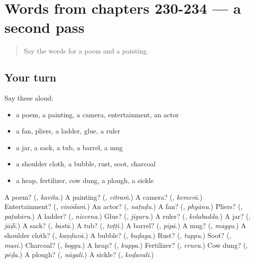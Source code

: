 \section[(dialogue)]{Words from chapters 230-234 — a second pass}

\label{lesson:TE-R234-second-pass-words-from-chapters-230-234}



\begin{quote}
Say the words for a poem and a painting.
\end{quote}

\subsection*{Your turn}
Say these aloud:

\begin{itemize}
\raggedright
  \item a poem, a painting, a camera, entertainment, an actor
  \item a fan, pliers, a ladder, glue, a ruler
  \item a jar, a sack, a tub, a barrel, a mug
  \item a shoulder cloth, a bubble, rust, soot, charcoal
  \item a heap, fertilizer, cow dung, a plough, a sickle
\end{itemize}

\begin{tcolorbox}[breakable,colback=teal!4,colframe=teal!35!black,title={Before you move on}]
A poem? (\textbf{}, \emph{kavita}.) A painting? (\textbf{}, \emph{citraṁ}.) A camera? (\textbf{}, \emph{kemerā}.) Entertainment? (\textbf{}, \emph{vinōdaṁ}.) An actor? (\textbf{}, \emph{naṭuḍu}.) A fan? (\textbf{}, \emph{phyānu}.) Pliers? (\textbf{}, \emph{paṭakāru}.) A ladder? (\textbf{}, \emph{niccena}.) Glue? (\textbf{}, \emph{jiguru}.) A ruler? (\textbf{}, \emph{kolabadda}.) A jar? (\textbf{}, \emph{jāḍī}.) A sack? (\textbf{}, \emph{bastā}.) A tub? (\textbf{}, \emph{toṭṭi}.) A barrel? (\textbf{}, \emph{pīpā}.) A mug? (\textbf{}, \emph{maggu}.) A shoulder cloth? (\textbf{}, \emph{kaṇḍuvā}.) A bubble? (\textbf{}, \emph{buḍaga}.) Rust? (\textbf{}, \emph{tuppu}.) Soot? (\textbf{}, \emph{masi}.) Charcoal? (\textbf{}, \emph{boggu}.) A heap? (\textbf{}, \emph{kuppa}.) Fertilizer? (\textbf{}, \emph{eruvu}.) Cow dung? (\textbf{}, \emph{pēḍa}.) A plough? (\textbf{}, \emph{nāgali}.) A sickle? (\textbf{}, \emph{koḍavali}.)
\end{tcolorbox}
